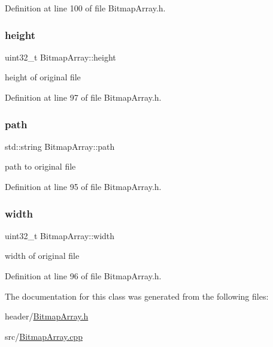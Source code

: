 Definition at line 100 of file Bitmap\+Array.\+h.

\mbox{\label{classBitmapArray_adb8d1a8fcc55c3884ad3eea71c6042be}} 
\subsubsection{\texorpdfstring{height}{height}}
{\footnotesize\ttfamily uint32\+\_\+t Bitmap\+Array\+::height\hspace{0.3cm}{\ttfamily [private]}}

height of original file 

Definition at line 97 of file Bitmap\+Array.\+h.

\mbox{\label{classBitmapArray_a3a3e1fbdd198c6731c7f6e20fb492445}} 
\subsubsection{\texorpdfstring{path}{path}}
{\footnotesize\ttfamily std\+::string Bitmap\+Array\+::path\hspace{0.3cm}{\ttfamily [private]}}

path to original file 

Definition at line 95 of file Bitmap\+Array.\+h.

\mbox{\label{classBitmapArray_a44f51b2c1ecde3f9aa504df25d65b6c9}} 
\subsubsection{\texorpdfstring{width}{width}}
{\footnotesize\ttfamily uint32\+\_\+t Bitmap\+Array\+::width\hspace{0.3cm}{\ttfamily [private]}}

width of original file 

Definition at line 96 of file Bitmap\+Array.\+h.



The documentation for this class was generated from the following files\+:\begin{DoxyCompactItemize}
\item 
header/\mbox{\hyperlink{BitmapArray_8h}{Bitmap\+Array.\+h}}\item 
src/\mbox{\hyperlink{BitmapArray_8cpp}{Bitmap\+Array.\+cpp}}\end{DoxyCompactItemize}
